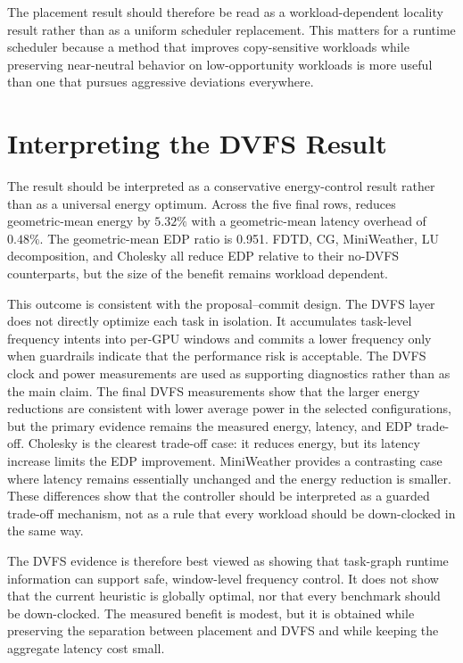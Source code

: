 The placement result should therefore be read as a workload-dependent locality
result rather than as a uniform scheduler replacement. This matters for a
runtime scheduler because a method that improves copy-sensitive workloads while
preserving near-neutral behavior on low-opportunity workloads is more useful
than one that pursues aggressive deviations everywhere.

\section{Interpreting the DVFS Result}
\label{sec:discussion-dvfs}

The \WinDVFS{} result should be interpreted as a conservative
energy-control result rather than as a universal energy optimum. Across the
five final rows, \WinDVFS{} reduces geometric-mean energy by \(5.32\%\) with a
geometric-mean latency overhead of \(0.48\%\). The geometric-mean EDP ratio is
0.951. FDTD, CG, MiniWeather, LU decomposition, and Cholesky all reduce EDP
relative to their no-DVFS counterparts, but the size of the benefit remains
workload dependent.

This outcome is consistent with the proposal--commit design. The DVFS layer
does not directly optimize each task in isolation. It accumulates task-level
frequency intents into per-GPU windows and commits a lower frequency only when
guardrails indicate that the performance risk is acceptable. The DVFS clock and
power measurements are used as supporting diagnostics rather than as the main
claim. The final DVFS measurements show that the larger energy reductions are
consistent with lower average power in the selected configurations, but the
primary evidence remains the measured energy, latency, and EDP trade-off.
Cholesky is the clearest trade-off case: it reduces energy, but its latency
increase limits the EDP improvement. MiniWeather provides a contrasting case
where latency remains essentially unchanged and the energy reduction is
smaller. These differences show that the controller should be interpreted as a
guarded trade-off mechanism, not as a rule that every workload should be
down-clocked in the same way.

The DVFS evidence is therefore best viewed as showing that task-graph runtime
information can support safe, window-level frequency control. It does not show
that the current heuristic is globally optimal, nor that every benchmark should
be down-clocked. The measured benefit is modest, but it is obtained while
preserving the separation between placement and DVFS and while keeping the
aggregate latency cost small.

